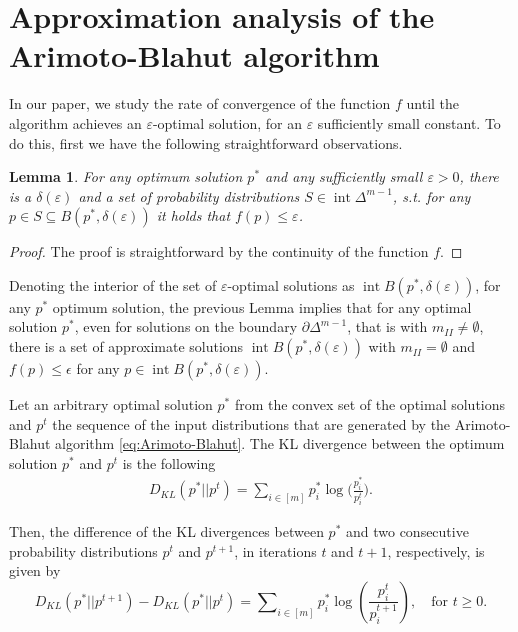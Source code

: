 \documentclass[11pt, letterpaper]{article}
\newtheorem{lemma}{Lemma}
\DeclareMathOperator{\interior}{int}
\begin{document}
\section{Approximation analysis of the Arimoto-Blahut algorithm}\label{Approximation analysis}

In our paper, we study the rate of convergence of the function $f$ until the algorithm achieves an $\varepsilon$-optimal solution, for an $\varepsilon$ sufficiently small constant. To do this, first we have the following straightforward observations.

\begin{lemma}
For any optimum solution $p^*$ and any sufficiently small $\varepsilon>0$, there is a $\delta(\varepsilon)$ and a set of probability distributions $S \in \interior \Delta^{m - 1}$, s.t.  for any $p \in S \subseteq B(p^*,\delta(\varepsilon))$ it holds that $f(p) \leq \varepsilon$.
\end{lemma}
\begin{proof}
The proof is straightforward by the continuity of the function $f$.

\end{proof}

Denoting the interior of the set of $\varepsilon$-optimal solutions as $\interior B(p^*,\delta(\varepsilon))$, for any $p^*$ optimum solution, the previous Lemma implies that for any optimal solution $p^*$, even for solutions on the boundary $\partial \Delta^{m-1}$, that is with $m_{II}\neq \emptyset$, there is a set of approximate solutions $\interior B(p^*,\delta(\varepsilon))$ with $m_{II}= \emptyset$ and $f(p) \leq \epsilon$ for any $p\in \interior B(p^*,\delta(\varepsilon))$.


Let an arbitrary optimal solution $p^*$ from the convex set of the optimal solutions and $p^t$ the sequence of the input distributions that are generated by the Arimoto-Blahut algorithm \eqref{eq:Arimoto-Blahut}. The KL divergence between the optimum solution $p^*$ and $p^t$ is the following
\begin{equation*}
\begin{split}
D_{KL}(p^* || p^t) = \sum_{i \in [m]} p^*_i \log\Big(\tfrac{p^*_i}{p^t_i}\Big).
\end{split}
\end{equation*}

Then, the difference of the KL divergences between $p^*$ and two consecutive probability distributions $p^t$ and $p^{t+1}$, in iterations $t$ and $t+1$, respectively, is given by
\begin{equation}\label{eq:KL divergence difference}
    D_{KL}(p^* || p^{t+1}) - D_{KL}(p^* || p^t) = \sum\nolimits_{i \in [m]} p^*_i \log\left(\frac{p^t_i}{p^{t+1}_i}\right), \quad \text{for } t \geq 0.
\end{equation}
\end{document}
